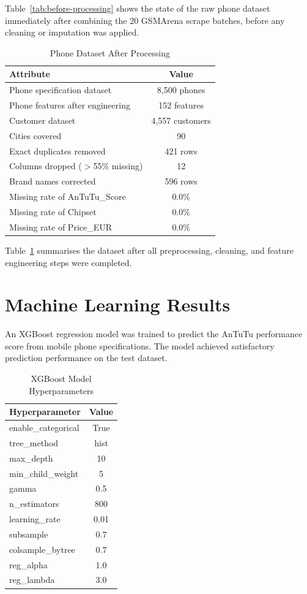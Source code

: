 \documentclass[12pt]{report}
\numberwithin{figure}{chapter}
\numberwithin{table}{chapter}
\numberwithin{equation}{chapter}
\begin{document}
Table~\ref{tab:before-processing} shows the state of the raw phone dataset immediately after combining the 20 GSMArena scrape batches, before any cleaning or imputation was applied.

\begin{table}[H]
\centering
\caption{Phone Dataset After Processing}
\label{tab:after-processing}
\begin{tabular}{|l|c|}
\hline
\textbf{Attribute} & \textbf{Value} \\
\hline
Phone specification dataset & 8,500 phones \\
\hline
Phone features after engineering & 152 features \\
\hline
Customer dataset & 4,557 customers \\
\hline
Cities covered & 90 \\
\hline
Exact duplicates removed & 421 rows \\
\hline
Columns dropped ($>$55\% missing) & 12 \\
\hline
Brand names corrected & 596 rows \\
\hline
Missing rate of AnTuTu\_Score & 0.0\% \\
\hline
Missing rate of Chipset & 0.0\% \\
\hline
Missing rate of Price\_EUR & 0.0\% \\
\hline
\end{tabular}
\end{table}

Table~\ref{tab:after-processing} summarises the dataset after all preprocessing, cleaning, and feature engineering steps were completed.

\section{Machine Learning Results}

An XGBoost regression model was trained to predict the AnTuTu performance score from mobile phone specifications. The model achieved satisfactory prediction performance on the test dataset.

\begin{table}[H]
\centering
\caption{XGBoost Model Hyperparameters}
\label{tab:xgb-hyperparams}
\begin{tabular}{|l|c|}
\hline
\textbf{Hyperparameter} & \textbf{Value} \\
\hline
enable\_categorical & True \\
\hline
tree\_method & hist \\
\hline
max\_depth & 10 \\
\hline
min\_child\_weight & 5 \\
\hline
gamma & 0.5 \\
\hline
n\_estimators & 800 \\
\hline
learning\_rate & 0.01 \\
\hline
subsample & 0.7 \\
\hline
colsample\_bytree & 0.7 \\
\hline
reg\_alpha & 1.0 \\
\hline
reg\_lambda & 3.0 \\
\hline
\end{tabular}
\end{table}
\end{document}
